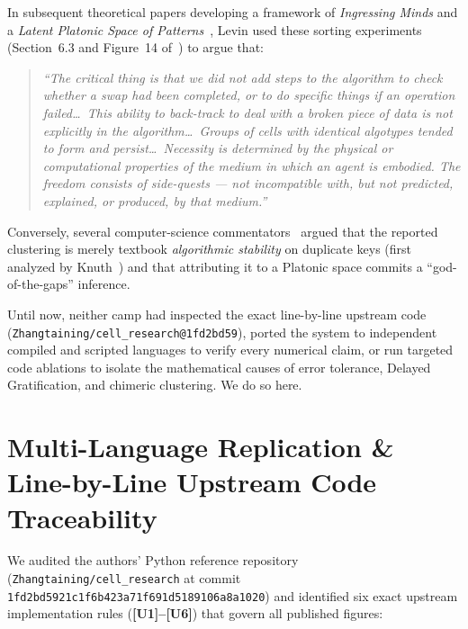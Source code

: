 \documentclass[11pt,a4paper]{article}
\theoremstyle{definition}
\theoremstyle{remark}
\begin{document}
In subsequent theoretical papers developing a framework of \emph{Ingressing Minds} and a \emph{Latent Platonic Space of Patterns}~\cite{Levin2025PsyArXiv,Levin2026Philosophies,Levin2024AlgorithmsRedux}, Levin used these sorting experiments (Section~6.3 and Figure~14 of~\cite{Levin2026Philosophies}) to argue that:
\begin{quote}
\emph{``The critical thing is that we did not add steps to the algorithm to check whether a swap had been completed, or to do specific things if an operation failed\dots\ This ability to back-track to deal with a broken piece of data is not explicitly in the algorithm\dots\ Groups of cells with identical algotypes tended to form and persist\dots\ Necessity is determined by the physical or computational properties of the medium in which an agent is embodied. The freedom consists of side-quests --- not incompatible with, but not predicted, explained, or produced, by that medium.''}~\cite[Sec.~6.3, pp.~22--23]{Levin2026Philosophies}
\end{quote}

Conversely, several computer-science commentators~\cite{Sweet2026} argued that the reported clustering is merely textbook \emph{algorithmic stability} on duplicate keys (first analyzed by Knuth~\cite{Knuth1973}) and that attributing it to a Platonic space commits a ``god-of-the-gaps'' inference.

Until now, neither camp had inspected the exact line-by-line upstream code (\texttt{Zhangtaining/cell\_research@1fd2bd59}), ported the system to independent compiled and scripted languages to verify every numerical claim, or run targeted code ablations to isolate the mathematical causes of error tolerance, Delayed Gratification, and chimeric clustering. We do so here.

\section{Multi-Language Replication \& Line-by-Line Upstream Code Traceability}

We audited the authors' Python reference repository (\texttt{Zhangtaining/cell\_research} at commit \texttt{1fd2bd5921c1f6b423a71f691d5189106a8a1020}) and identified six exact upstream implementation rules (\textbf{[U1]--\textbf{[U6]}}) that govern all published figures:
\end{document}
